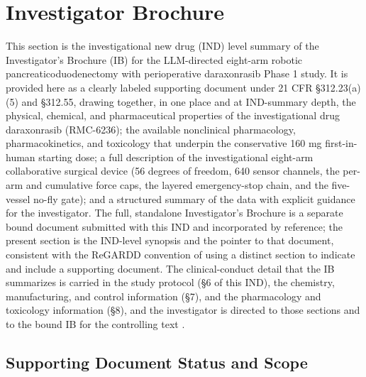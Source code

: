 \section{Investigator Brochure}

This section is the investigational new drug (IND) level summary of the
Investigator's Brochure (IB) for the LLM-directed eight-arm robotic
pancreaticoduodenectomy with perioperative daraxonrasib Phase 1 study. It is
provided here as a clearly labeled supporting document under 21 CFR
\S 312.23(a)(5) and \S 312.55, drawing together, in one place and at IND-summary
depth, the physical, chemical, and pharmaceutical properties of the
investigational drug daraxonrasib (RMC-6236); the available nonclinical
pharmacology, pharmacokinetics, and toxicology that underpin the conservative
160 mg first-in-human starting dose; a full description of the investigational
eight-arm collaborative surgical device (56 degrees of freedom, 640 sensor
channels, the per-arm and cumulative force caps, the layered emergency-stop chain,
and the five-vessel no-fly gate); and a structured summary of the data with
explicit guidance for the investigator. The full, standalone Investigator's
Brochure is a separate bound document submitted with this IND and incorporated by
reference; the present section is the IND-level synopsis and the pointer to that
document, consistent with the ReGARDD convention of using a distinct section to
indicate and include a supporting document. The clinical-conduct detail that the
IB summarizes is carried in the study protocol (\S 6 of this IND), the chemistry,
manufacturing, and control information (\S 7), and the pharmacology and
toxicology information (\S 8), and the investigator is directed to those sections
and to the bound IB for the controlling text \cite{phase1guidance,daraxwhipple}.

\subsection*{Supporting Document Status and Scope}

